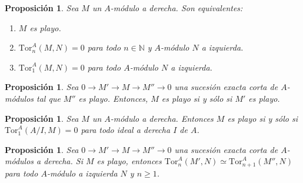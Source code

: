 \documentclass[12pt]{book}
\newtheorem{prop}[teo]{Proposición}
\theoremstyle{definition}
\begin{document}
\begin{prop}
Sea $M$ un $A$-módulo a derecha. Son equivalentes: \begin{enumerate}\item $M$ es playo. \item $\mathrm{Tor}_n^A(M,N)=0$ para todo $n\in\mathbb{N}$ y $A$-módulo $N$ a izquierda. \item $\mathrm{Tor}_1^A(M,N)=0$ para todo $A$-módulo $N$ a izquierda.  \end{enumerate}
\end{prop}

\begin{prop}
Sea $0\longrightarrow M'\longrightarrow M\longrightarrow M''\longrightarrow 0$ una sucesión exacta corta de $A$-módulos tal que $M''$ es playo. Entonces, $M$ es playo si y sólo si $M'$ es playo.
\end{prop}

\begin{prop}
Sea $M$ un $A$-módulo a derecha. Entonces $M$ es playo si y sólo si $\mathrm{Tor}_1^A(A/I,M)=0$ para todo ideal a derecha $I$ de $A$.
\end{prop}

\begin{prop}
Sea $0\longrightarrow M'\longrightarrow M\longrightarrow M''\longrightarrow 0$ una sucesión exacta corta de $A$-módulos a derecha. Si $M$ es playo, entonces $\mathrm{Tor}_n^A(M',N)\simeq \mathrm{Tor}_{n+1}^A(M'',N)$ para todo $A$-módulo a izquierda $N$ y $n\geq 1$.
\end{prop}
\end{document}
